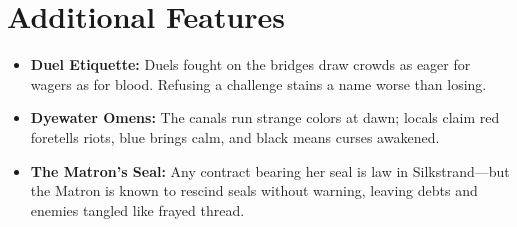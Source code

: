 \section*{Additional Features}
\begin{itemize}
\item \textbf{Duel Etiquette:} Duels fought on the bridges draw crowds as eager for wagers as for blood. Refusing a challenge stains a name worse than losing.
\item \textbf{Dyewater Omens:} The canals run strange colors at dawn; locals claim red foretells riots, blue brings calm, and black means curses awakened.
\item \textbf{The Matron’s Seal:} Any contract bearing her seal is law in Silkstrand---but the Matron is known to rescind seals without warning, leaving debts and enemies tangled like frayed thread.
\end{itemize}